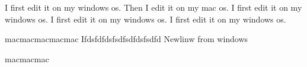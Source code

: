 I first edit it on my windows os.
Then I edit it on my mac os.
I first edit it on my windows os.
I first edit it on my windows os.
I first edit it on my windows os.

macmacmacmacmac
Ifdsfdfdsfsdfsdfdsfsdfd
Newlinw from windows


macmacmac
